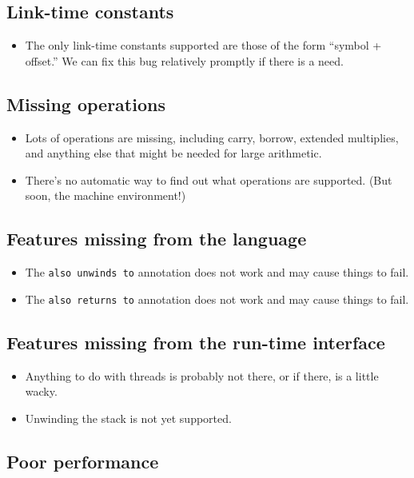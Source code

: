 \documentclass{article}
\begin{document}
\subsection{Link-time constants}
\begin{itemize}
\item
The only link-time constants supported are those of the form ``symbol
+ offset.''
We can fix this bug relatively promptly if there is a need.
\end{itemize}



\subsection{Missing operations}

\begin{itemize}
\item
Lots of operations are missing, including
carry, borrow, extended multiplies, and anything else that might be
needed for large arithmetic.
\item
There's no automatic way to find out what operations are supported.
(But soon, the machine environment!)
\end{itemize}

\subsection{Features missing from the language}

\begin{itemize}
\item
The \texttt{also unwinds to} annotation does not work and may cause
things to fail.
\item
The \texttt{also returns to} annotation does not work and may cause
things to fail.
\end{itemize}


\subsection{Features missing from the run-time interface}
\begin{itemize}
\item
Anything to do with threads is probably not there, or if there, is a
little wacky.
\item
Unwinding the stack is not yet supported.
\end{itemize}

\subsection{Poor performance}
\end{document}
